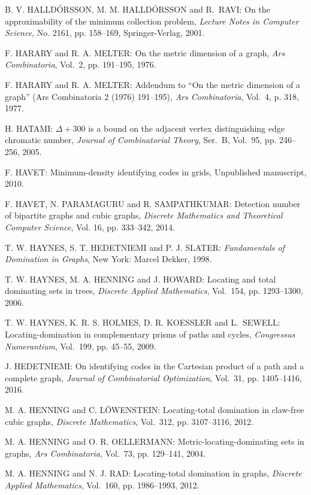 \begin{thebibliography}{999}
B. V. HALLD\'ORSSON, M. M. HALLD\'ORSSON and R.~RAVI: On the approximability of the minimum collection problem, {\it Lecture Notes in Computer Science}, No. 2161, pp. 158--169, Springer-Verlag, 2001.

F. HARARY and R. A. MELTER: On the metric dimension of a graph, {\it Ars Combinatoria}, Vol.~2, pp. 191--195, 1976.

F. HARARY and R. A. MELTER: Addendum to ``On the metric dimension of a graph'' (Ars Combinatoria 2 (1976) 191--195), {\it Ars Combinatoria}, Vol.~4, p. 318, 1977.

H. HATAMI: $\Delta +300$ is a bound on the adjacent vertex distinguishing edge chromatic number, {\it Journal of Combinatorial Theory}, Ser.~B, Vol.~95, pp. 246--256, 2005.

F. HAVET: Minimum-density identifying codes in grids, Unpublished manuscript, 2010.

F. HAVET, N. PARAMAGURU and R. SAMPATHKUMAR: Detection number of bipartite graphs and cubic graphs, {\it Discrete Mathematics and Theoretical Computer Science}, Vol. 16, pp. 333--342, 2014.

T. W. HAYNES, S. T. HEDETNIEMI and P. J. SLATER: {\it Fundamentals of Domination in Graphs}, New York: Marcel Dekker, 1998.

T. W. HAYNES, M. A. HENNING and J. HOWARD: Locating and total dominating sets in trees, {\it Discrete Applied Mathematics}, Vol.~154, pp. 1293--1300, 2006.

T. W. HAYNES, K. R. S. HOLMES, D. R. KOESSLER and L.~SEWELL: Locating-domination in complementary prisms of paths and cycles, {\it Congressus Numerantium}, Vol.~199, pp. 45--55, 2009.

J. HEDETNIEMI: On identifying codes in the Cartesian product of a path and a complete graph, {\it Journal of Combinatorial Optimization}, Vol.~31, pp. 1405--1416, 2016.

M. A. HENNING and C. L\"{O}WENSTEIN: Locating-total domination in claw-free cubic graphs, {\it Discrete Mathematics}, Vol.~312, pp. 3107--3116, 2012. 

M. A. HENNING and O. R. OELLERMANN: Metric-locating-dominating sets in graphs, {\it Ars Combinatoria}, Vol.~73, pp. 129--141, 2004.

M. A. HENNING and N. J. RAD: Locating-total domination in graphs, {\it Discrete Applied Mathematics}, Vol.~160, pp. 1986--1993, 2012.


\end{thebibliography}
